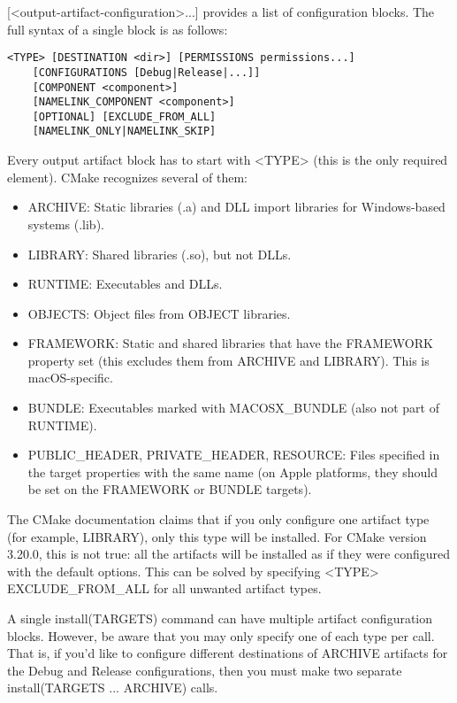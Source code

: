 [<output-artifact-configuration>...] provides a list of configuration blocks. The full syntax of a single block is as follows:

\begin{lstlisting}[style=styleCMake]
<TYPE> [DESTINATION <dir>] [PERMISSIONS permissions...]
	[CONFIGURATIONS [Debug|Release|...]]
	[COMPONENT <component>]
	[NAMELINK_COMPONENT <component>]
	[OPTIONAL] [EXCLUDE_FROM_ALL]
	[NAMELINK_ONLY|NAMELINK_SKIP]
\end{lstlisting}

Every output artifact block has to start with <TYPE> (this is the only required element). CMake recognizes several of them:

\begin{itemize}
\item 
ARCHIVE: Static libraries (.a) and DLL import libraries for Windows-based systems (.lib).

\item 
LIBRARY: Shared libraries (.so), but not DLLs.

\item 
RUNTIME: Executables and DLLs.

\item 
OBJECTS: Object files from OBJECT libraries.

\item 
FRAMEWORK: Static and shared libraries that have the FRAMEWORK property set (this excludes them from ARCHIVE and LIBRARY). This is macOS-specific.

\item 
BUNDLE: Executables marked with MACOSX\_BUNDLE (also not part of RUNTIME).

\item 
PUBLIC\_HEADER, PRIVATE\_HEADER, RESOURCE: Files specified in the target properties with the same name (on Apple platforms, they should be set on the FRAMEWORK or BUNDLE targets).
\end{itemize}

The CMake documentation claims that if you only configure one artifact type (for example, LIBRARY), only this type will be installed. For CMake version 3.20.0, this is not true: all the artifacts will be installed as if they were configured with the default options. This can be solved by specifying <TYPE> EXCLUDE\_FROM\_ALL for all unwanted artifact types.

\begin{tcolorbox}[colback=blue!5!white,colframe=blue!75!black,title=Note]
A single install(TARGETS) command can have multiple artifact configuration blocks. However, be aware that you may only specify one of each type per call. That is, if you'd like to configure different destinations of ARCHIVE artifacts for the Debug and Release configurations, then you must make two separate install(TARGETS ... ARCHIVE) calls.
\end{tcolorbox}

